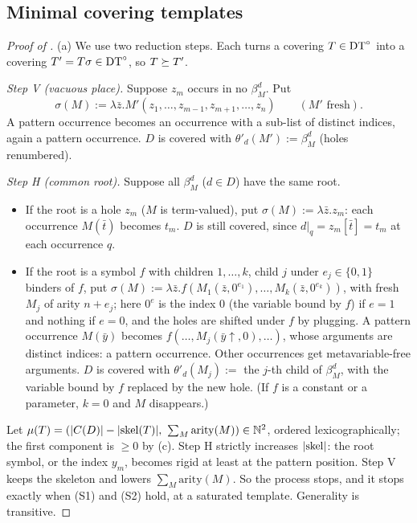 \subsection{Minimal covering templates}\label{app:single:min}

\begin{proof}[Proof of ]
(a) We use two reduction steps. Each turns a covering $T\in\mathrm{DT}^{\circ}$ into a covering $T'=T\sigma\in\mathrm{DT}^{\circ}$, so $T\succeq T'$.

\emph{Step V (vacuous place).} Suppose $z_m$ occurs in no $\beta^d_M$. Put
\[
\sigma(M):=\lambda\bar z.M'(z_1,\dots,z_{m-1},z_{m+1},\dots,z_n)\qquad(M'\text{ fresh}).
\] A pattern occurrence becomes an occurrence with a sub-list of distinct indices, again a pattern occurrence. $D$ is covered with $\theta'_d(M'):=\beta^d_M$ (holes renumbered).

\emph{Step H (common root).} Suppose all $\beta^d_M$ ($d\in D$) have the same root.
\begin{itemize}
\item If the root is a hole $z_m$ ($M$ is term-valued), put $\sigma(M):=\lambda\bar z.z_m$: each occurrence $M(\bar t)$ becomes $t_m$. $D$ is still covered, since $d|_q=z_m[\bar t]=t_m$ at each occurrence $q$.
\item If the root is a symbol $f$ with children $1,\dots,k$, child $j$ under $e_j\in\{0,1\}$ binders of $f$, put $\sigma(M):=\lambda\bar z.f(M_1(\bar z,0^{e_1}),\dots,M_k(\bar z,0^{e_k}))$, with fresh $M_j$ of arity $n+e_j$; here $0^{e}$ is the index $0$ (the variable bound by $f$) if $e=1$ and nothing if $e=0$, and the holes are shifted under $f$ by plugging. A pattern occurrence $M(\bar y)$ becomes $f(\dots,M_j(\bar y{\uparrow},0),\dots)$, whose arguments are distinct indices: a pattern occurrence. Other occurrences get metavariable-free arguments. $D$ is covered with $\theta'_d(M_j):=$ the $j$-th child of $\beta^d_M$, with the variable bound by $f$ replaced by the new hole. (If $f$ is a constant or a parameter, $k=0$ and $M$ disappears.)
\end{itemize}
Let $\mu(T)=(|C(D)|-|\singleskel(T)|,\ \sum_M\mathrm{arity}(M))\in\N^2$, ordered lexicographically; the first component is $\ge0$ by (c). Step H strictly increases $|\mathrm{skel}|$: the root symbol, or the index $y_m$, becomes rigid at least at the pattern position. Step V keeps the skeleton and lowers $\sum_M\mathrm{arity}(M)$. So the process stops, and it stops exactly when (S1) and (S2) hold, at a saturated template. Generality is transitive.


\end{proof}

